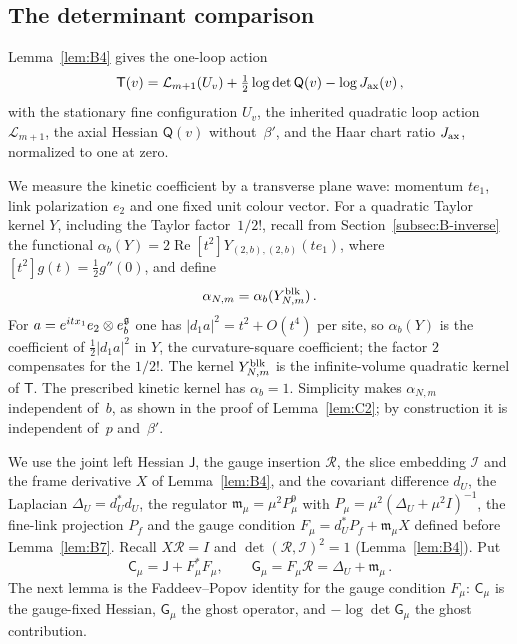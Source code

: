 \subsection{The determinant comparison}\label{subsec:C-determinant}

Lemma~\ref{lem:B4} gives the one-loop action
\begin{equation*}
\mathsf T(v)=\mathcal L_{m+1}(U_v)+\tfrac12\log\det\mathsf Q(v)-\log J_{\rm ax}(v)\,,
\end{equation*}
with the stationary fine configuration $U_v$, the inherited quadratic loop action $\mathcal L_{m+1}$, the axial Hessian $\mathsf Q(v)$ without~$\beta'$, and the Haar chart ratio $J_{\rm ax}$, normalized to one at zero.

We measure the kinetic coefficient by a transverse plane wave: momentum $te_1$, link polarization $e_2$ and one fixed unit colour vector. For a quadratic Taylor kernel $Y$, including the Taylor factor~$1/2!$, recall from Section~\ref{subsec:B-inverse} the functional $\alpha_b(Y)=2\operatorname{Re}[t^2]Y_{(2,b),(2,b)}(te_1)$, where $[t^2]g(t)=\tfrac12g''(0)$, and define
\begin{equation*}
\alpha_{N,m}=\alpha_b(Y^{\rm blk}_{N,m})\,.
\end{equation*}
For $a=e^{itx_1}e_2\otimes e_b^{\mathfrak{g}}$ one has $|d_1a|^2=t^2+O(t^4)$ per site, so $\alpha_b(Y)$ is the coefficient of $\frac12|d_1a|^2$ in $Y$, the curvature-square coefficient; the factor $2$ compensates for the $1/2!$. The kernel $Y^{\rm blk}_{N,m}$ is the infinite-volume quadratic kernel of $\mathsf T$. The prescribed kinetic kernel has $\alpha_b=1$. Simplicity makes $\alpha_{N,m}$ independent of~$b$, as shown in the proof of Lemma~\ref{lem:C2}; by construction it is independent of~$p$ and~$\beta'$.

We use the joint left Hessian $\mathsf J$, the gauge insertion $\mathcal R$, the slice embedding $\mathcal I$ and the frame derivative $X$ of Lemma~\ref{lem:B4}, and the covariant difference $d_U$, the Laplacian $\Delta_U=d_U^*d_U$, the regulator $\mathfrak m_\mu=\mu^2P_\mu^9$ with $P_\mu=\mu^2(\Delta_U+\mu^2I)^{-1}$, the fine-link projection $P_f$ and the gauge condition $F_\mu=d_U^*P_f+\mathfrak m_\mu X$ defined before Lemma~\ref{lem:B7}. Recall $X\mathcal R=I$ and $\det(\mathcal R,\mathcal I)^2=1$ (Lemma~\ref{lem:B4}). Put
\begin{equation*}
\mathsf C_\mu=\mathsf J+F_\mu^*F_\mu,\qquad
\mathsf G_\mu=F_\mu\mathcal R=\Delta_U+\mathfrak m_\mu\,.
\end{equation*}
The next lemma is the Faddeev--Popov identity for the gauge condition $F_\mu$: $\mathsf C_\mu$ is the gauge-fixed Hessian, $\mathsf G_\mu$ the ghost operator, and $-\log\det\mathsf G_\mu$ the ghost contribution.

